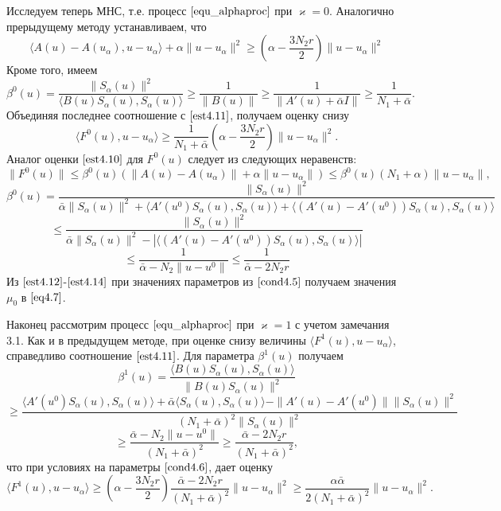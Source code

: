 Исследуем теперь МНС, т.е. процесс $\eqref{equ_alphaproc}$ при $\varkappa=0$. Аналогично прерыдущему методу устанавливаем, что
\begin{equation}\label{est4.11}
\langle A(u)-A(u_\alpha), u-u_\alpha\rangle+\alpha\|u-u_\alpha\|^2\ge\left(\alpha-\frac{3N_2 r}{2}\right)\|u-u_\alpha\|^2
\end{equation}
Кроме того, имеем
$$\beta^0(u)=\frac{\|S_\alpha(u)\|^2}{\langle B(u)S_\alpha(u), S_\alpha(u)\rangle}\ge\frac{1}{\|B(u)\|}\ge\frac{1}{\|A'(u)+\bar\alpha I\|}\ge\frac{1}{N_1+\bar\alpha}.$$
Объединяя последнее соотношение с $\eqref{est4.11}$, получаем оценку снизу
\begin{equation}\label{est4.12}
\langle F^0(u), u-u_\alpha\rangle\ge\frac{1}{N_1+\bar\alpha}\left (\alpha -\frac{3N_2 r}{2}\right )\|u-u_\alpha\|^2.
\end{equation}
Аналог оценки $\eqref{est4.10}$ для $F^0(u)$ следует из следующих неравенств:
\begin{equation}\label{est4.13}
\|F^0(u)\|\le\beta^0(u)(\|A(u)-A(u_\alpha)\|+\alpha\|u-u_\alpha\|)\le\beta^0(u)(N_1+\alpha)\|u-u_\alpha\|,
\end{equation}
$$\beta^0(u)=\frac{\|S_\alpha(u)\|^2}{\bar\alpha\|S_\alpha(u)\|^2+\langle A'(u^0)S_\alpha(u), S_\alpha(u)\rangle+\langle (A'(u)-A'(u^0))S_\alpha(u), S_\alpha(u)\rangle}$$
$$\le \frac{\|S_\alpha(u)\|^2}{\bar\alpha\|S_\alpha(u)\|^2-|\langle (A'(u)-A'(u^0))S_\alpha(u), S_\alpha(u)\rangle|}$$
\begin{equation}\label{est4.14}
\le\frac{1}{\bar\alpha -N_2\|u-u^0\|}\le\frac{1}{\bar\alpha -2N_2 r}
\end{equation}
Из $\eqref{est4.12}$-$\eqref{est4.14}$ при значениях параметров из $\eqref{cond4.5}$ получаем значения $\mu_0$ в $\eqref{eq4.7}$.

Наконец рассмотрим процесс $\eqref{equ_alphaproc}$ при $\varkappa=1$ с учетом замечания 3.1. Как и в предыдущем методе, при оценке снизу величины $\langle F^1(u), u-u_\alpha\rangle$, справедливо соотношение $\eqref{est4.11}$. Для параметра $\beta^1(u)$ получаем
$$\beta^1(u)=\frac{\langle B(u)S_\alpha(u), S_\alpha(u)\rangle}{\|B(u)S_\alpha(u)\|^2}$$$$\ge\frac{\langle A'(u^0)S_\alpha(u), S_\alpha(u)\rangle+\bar\alpha\langle S_\alpha(u), S_\alpha(u)\rangle-\|A'(u)-A'(u^0)\|\|S_\alpha(u)\|^2}{(N_1+\bar\alpha)^2\|S_\alpha(u)\|^2}$$$$\ge\frac{\bar\alpha -N_2\|u-u^0\|}{(N_1+\bar\alpha)^2}\ge\frac{\bar\alpha -2N_2 r}{(N_1+\bar\alpha)^2},$$
что при условиях на параметры $\eqref{cond4.6}$, дает оценку
\begin{equation}\label{est4.15}
\langle F^1(u), u-u_\alpha\rangle\ge\left (\alpha -\frac{3N_2 r}{2}\right )\frac{\bar\alpha - 2N_2 r}{(N_1+\bar\alpha)^2}\|u-u_\alpha\|^2\ge\frac{\alpha\bar\alpha}{2(N_1+\bar\alpha)^2}\|u-u_\alpha\|^2.
\end{equation}

